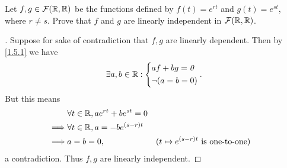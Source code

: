 \begin{ex}\label{ex:1.5.20}
  Let \(f, g \in \mathcal{F}(\mathbb{R}, \mathbb{R})\) be the functions defined by \(f(t) = e^{rt}\) and \(g(t) = e^{st}\), where \(r \neq s\).
  Prove that \(f\) and \(g\) are linearly independent in \(\mathcal{F}(\mathbb{R}, \mathbb{R})\).
\end{ex}

\begin{proof}[]
  Suppose for sake of contradiction that \(f, g\) are linearly dependent.
  Then by \cref{1.5.1} we have
  \[
    \exists a, b \in \mathbb{R} : \begin{dcases}
      af + bg = \mathit{0} \\
      \lnot (a = b = 0)
    \end{dcases}.
  \]
  But this means
  \begin{align*}
             & \forall t \in \mathbb{R}, ae^{rt} + be^{st} = 0                                                         \\
    \implies & \forall t \in \mathbb{R}, a = -b e^{(s - r) t}                                                          \\
    \implies & a = b = 0,                              &  & \text{(\(t \mapsto e^{(s - r) t}\) is one-to-one)}
  \end{align*}
  a contradiction.
  Thus \(f, g\) are linearly independent.
\end{proof}
